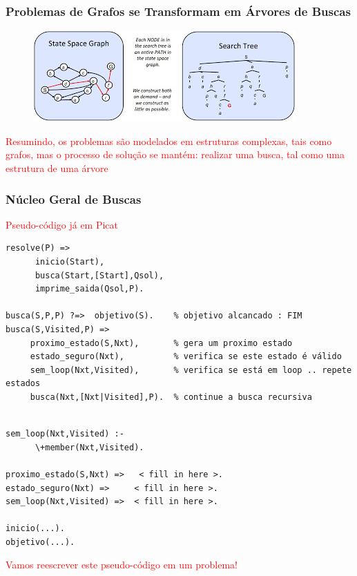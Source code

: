 \begin{frame}[fragile]
\frametitle{Problemas de Grafos se Transformam em Árvores de Buscas}

\begin{figure}[!htb]
\centering
\includegraphics[width=.99\textwidth, height=0.55\textheight]{figures/espaco-estado-arvore.jpg}
\end{figure}

\textcolor{red}{Resumindo, os problemas são modelados  em 
estruturas  complexas, tais como grafos, mas o processo de solução
se mantém: realizar uma busca, tal como uma estrutura de uma árvore }

\end{frame}




\begin{frame}[fragile, allowframebreaks=0.9]
  \frametitle{Núcleo Geral de Buscas}

\textcolor{red}{Pseudo-código já em Picat}

\begin{verbatim}
resolve(P) =>
      inicio(Start),
      busca(Start,[Start],Qsol),
      imprime_saida(Qsol,P).

busca(S,P,P) ?=>  objetivo(S).    % objetivo alcancado : FIM    
busca(S,Visited,P) =>
     proximo_estado(S,Nxt),       % gera um proximo estado  
     estado_seguro(Nxt),          % verifica se este estado é válido 
     sem_loop(Nxt,Visited),       % verifica se está em loop .. repete estados 
     busca(Nxt,[Nxt|Visited],P).  % continue a busca recursiva 
\end{verbatim}


\framebreak


\begin{verbatim}

sem_loop(Nxt,Visited) :-
      \+member(Nxt,Visited).

proximo_estado(S,Nxt) =>   < fill in here >.
estado_seguro(Nxt) =>     < fill in here >.
sem_loop(Nxt,Visited) =>  < fill in here >.     
                       
inicio(...).
objetivo(...).

\end{verbatim}


\textcolor{red}{Vamos reescrever este pseudo-código em um problema!}


\end{frame}



